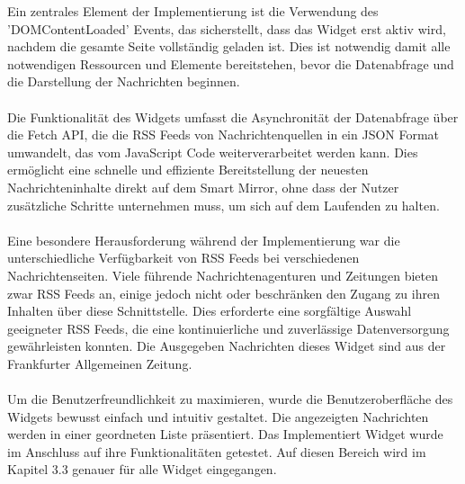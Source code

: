 \noindent
Ein zentrales Element der Implementierung ist die Verwendung des 'DOMContentLoaded' Events, das sicherstellt, dass das Widget erst aktiv wird, nachdem die gesamte Seite vollständig geladen ist. Dies ist notwendig damit alle notwendigen Ressourcen und Elemente bereitstehen, bevor die Datenabfrage und die Darstellung der Nachrichten beginnen. \\ \\
\noindent
Die Funktionalität des Widgets umfasst die Asynchronität der Datenabfrage über die Fetch API, die die RSS Feeds von Nachrichtenquellen in ein JSON Format umwandelt, das vom JavaScript Code weiterverarbeitet werden kann. Dies ermöglicht eine schnelle und effiziente Bereitstellung der neuesten Nachrichteninhalte direkt auf dem Smart Mirror, ohne dass der Nutzer zusätzliche Schritte unternehmen muss, um sich auf dem Laufenden zu halten. \\ \\
\noindent
Eine besondere Herausforderung während der Implementierung war die unterschiedliche Verfügbarkeit von RSS Feeds bei verschiedenen Nachrichtenseiten. Viele führende Nachrichtenagenturen und Zeitungen bieten zwar RSS Feeds an, einige jedoch nicht oder beschränken den Zugang zu ihren Inhalten über diese Schnittstelle. Dies erforderte eine sorgfältige Auswahl geeigneter RSS Feeds, die eine kontinuierliche und zuverlässige Datenversorgung gewährleisten konnten. Die Ausgegeben Nachrichten dieses Widget sind aus der Frankfurter Allgemeinen Zeitung. \\ \\
\noindent
Um die Benutzerfreundlichkeit zu maximieren, wurde die Benutzeroberfläche des Widgets bewusst einfach und intuitiv gestaltet. Die angezeigten Nachrichten werden in einer geordneten Liste präsentiert.
\noindent
Das Implementiert Widget wurde im Anschluss auf ihre Funktionalitäten getestet. Auf diesen Bereich wird im Kapitel 3.3 genauer für alle Widget eingegangen.




